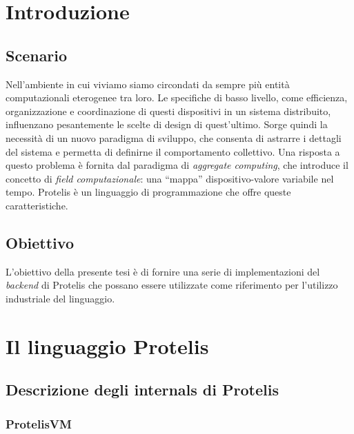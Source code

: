 \documentclass{article}
\begin{document}
\section{Introduzione}

\subsection{Scenario}

Nell'ambiente in cui viviamo siamo circondati da sempre più entità computazionali eterogenee tra loro. Le specifiche di basso livello, come efficienza, organizzazione e coordinazione di questi dispositivi in un sistema distribuito, influenzano pesantemente le scelte di design di quest'ultimo. Sorge quindi la necessità di un nuovo paradigma di sviluppo, che consenta di astrarre i dettagli del sistema e permetta di definirne il comportamento collettivo. Una risposta a questo problema è fornita dal paradigma di \textit{aggregate computing}, che introduce il concetto di \textit{field computazionale}: una ``mappa'' dispositivo-valore variabile nel tempo. Protelis è un linguaggio di programmazione che offre queste caratteristiche.


\subsection{Obiettivo}

L'obiettivo della presente tesi è di fornire una serie di implementazioni del \textit{backend} di Protelis che possano essere utilizzate come riferimento per l'utilizzo industriale del linguaggio.

\section{Il linguaggio Protelis}

\subsection{Descrizione degli internals di Protelis}

\subsubsection{ProtelisVM}
\end{document}
